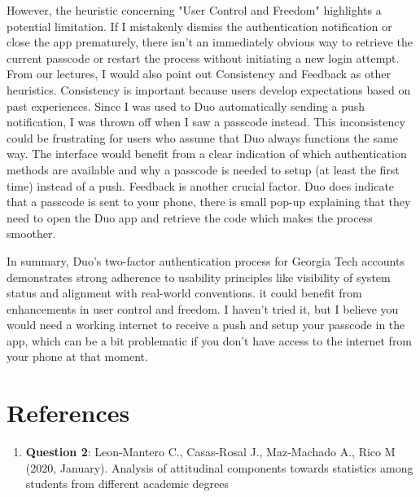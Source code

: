 \documentclass[
	letterpaper, %
]{jdf}
\begin{document}
However, the heuristic concerning "User Control and Freedom" highlights a potential limitation. If I mistakenly dismiss the authentication notification or close the app prematurely, there isn't an immediately obvious way to retrieve the current passcode or restart the process without initiating a new login attempt. From our lectures, I would also point out Consistency and Feedback as other heuristics. Consistency is important because users develop expectations based on past experiences. Since I was used to Duo automatically sending a push notification, I was thrown off when I saw a passcode instead. This inconsistency could be frustrating for users who assume that Duo always functions the same way. The interface would benefit from a clear indication of which authentication methods are available and why a passcode is needed to setup (at least the first time) instead of a push. Feedback is another crucial factor.  Duo does indicate that a passcode is sent to your phone,  there is small pop-up explaining that they need to open the Duo app and retrieve the code which makes the process smoother.

In summary, Duo's two-factor authentication process for Georgia Tech accounts demonstrates strong adherence to usability principles like visibility of system status and alignment with real-world conventions.  it could benefit from enhancements in user control and freedom. I haven't tried it, but I believe you would need a working internet to receive a push and setup your passcode in the app, which can be a bit problematic if you don't have access to the internet from your phone at that moment. 

\newpage

\section{References}

\printbibliography[heading=none]
\begin{enumerate}
    \item \textbf{Question 2}: \hfill \break
    Leon-Mantero C., Casas-Rosal J., Maz-Machado A., Rico M (2020, January). Analysis of attitudinal components towards statistics among students from different academic degrees
     

\end{enumerate}
\end{document}
